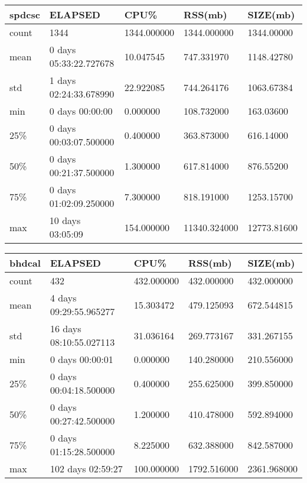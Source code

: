 \documentclass{article}
\begin{document}
\begin{table}[H]
\begin{tabular}{|l|l|l|l|l|}
\hline spdcsc& ELAPSED&    CPU\%&   RSS(mb)&  SIZE(mb) \\
\hline count&   1344& 1344.000000&  1344.000000&  1344.00000 \\
\hline mean&  0 days 05:33:22.727678&  10.047545&  747.331970&  1148.42780 \\
\hline std&  1 days 02:24:33.678990&  22.922085&  744.264176&  1063.67384 \\
\hline min&   0 days 00:00:00&   0.000000&  108.732000&  163.03600 \\
\hline 25\%&  0 days 00:03:07.500000&   0.400000&  363.873000&  616.14000 \\
\hline 50\%&  0 days 00:21:37.500000&   1.300000&  617.814000&  876.55200 \\
\hline 75\%&  0 days 01:02:09.250000&   7.300000&  818.191000&  1253.15700 \\
\hline max&  10 days 03:05:09&  154.000000& 11340.324000& 12773.81600 \\
\hline 
\end{tabular}
\label{TABLE-SessionSizespdcsc}
\end{table}

\begin{table}[H]
\begin{tabular}{|l|l|l|l|l|}
\hline bhdcal& ELAPSED&    CPU\%&   RSS(mb)&  SIZE(mb) \\
\hline count&                      432&  432.000000 &  432.000000 &  432.000000 \\
\hline mean&    4 days 09:29:55.965277&   15.303472 &  479.125093 &  672.544815 \\
\hline std&    16 days 08:10:55.027113&   31.036164 &  269.773167 &  331.267155 \\
\hline min&            0 days 00:00:01&    0.000000 &  140.280000  & 210.556000 \\
\hline 25\%&     0 days 00:04:18.500000&    0.400000 &  255.625000 &  399.850000 \\
\hline 50\%&     0 days 00:27:42.500000&    1.200000 &  410.478000 &  592.894000 \\
\hline 75\%&     0 days 01:15:28.500000&    8.225000 &  632.388000 &  842.587000 \\
\hline max&          102 days 02:59:27&  100.000000 & 1792.516000&  2361.968000 \\
\hline 
\end{tabular}
\label{TABLE-SessionSizebhdcal}
\end{table}
\end{document}
